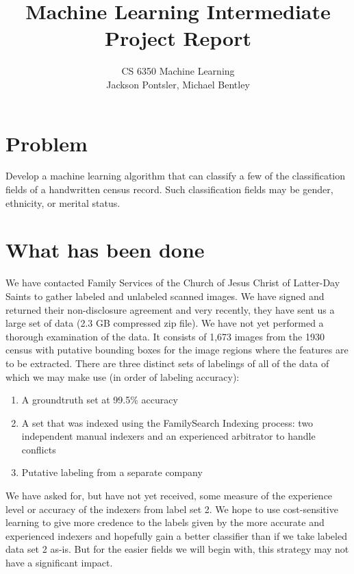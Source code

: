 \documentclass[12pt]{article}
\title{Machine Learning Intermediate Project Report}
\author{
  CS 6350 Machine Learning \\
  Jackson Pontsler, Michael Bentley
  }
\date{}
\begin{document}
\maketitle

\section{Problem}

Develop a machine learning algorithm that can classify a few of the classification fields of a handwritten census record.  Such classification fields may be gender, ethnicity, or merital status.

\section{What has been done}

We have contacted Family Services of the Church of Jesus Christ of Latter-Day Saints to gather labeled and unlabeled scanned images.  We have signed and returned their non-disclosure agreement and very recently, they have sent us a large set of data (2.3 GB compressed zip file).  We have not yet performed a thorough examination of the data.  It consists of 1,673 images from the 1930 census with putative bounding boxes for the image regions where the features are to be extracted.  There are three distinct sets of labelings of all of the data of which we may make use (in order of labeling accuracy):
\begin{enumerate}
  \item A groundtruth set at 99.5\% accuracy
  \item A set that was indexed using the FamilySearch Indexing process: two independent manual indexers and an experienced arbitrator to handle conflicts \cite{hansen2013quality}
  \item Putative labeling from a separate company
\end{enumerate}
We have asked for, but have not yet received, some measure of the experience level or accuracy of the indexers from label set 2.  We hope to use cost-sensitive learning to give more credence to the labels given by the more accurate and experienced indexers and hopefully gain a better classifier than if we take labeled data set 2 as-is.  But for the easier fields we will begin with, this strategy may not have a significant impact.
\end{document}
